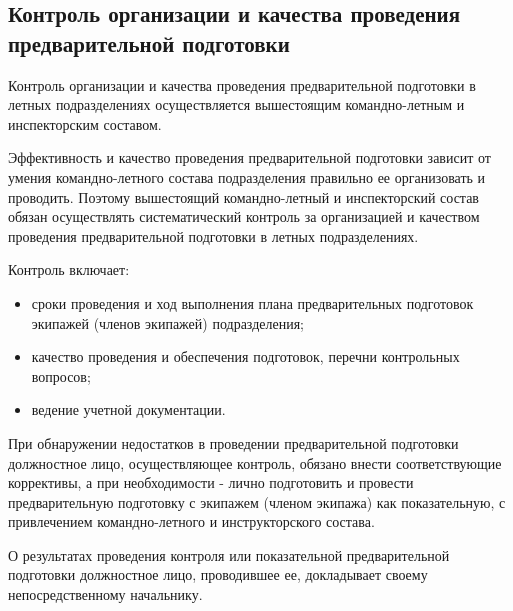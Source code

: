 \subsection{Контроль организации и качества проведения предварительной подготовки}
\setcounter{subsect}{1}

Контроль организации и качества проведения предварительной подготовки в летных подразделениях осуществляется вышестоящим командно-летным и инспекторским составом.

Эффективность и качество проведения предварительной подготовки зависит от умения командно-летного состава подразделения правильно ее организовать и проводить. Поэтому вышестоящий командно-летный и инспекторский состав обязан осуществлять систематический контроль за организацией и качеством проведения предварительной подготовки в летных подразделениях.

Контроль включает:
\begin{itemize}
    \item сроки проведения и ход выполнения плана предварительных подготовок экипажей (членов экипажей) подразделения;
    \item качество проведения и обеспечения подготовок, перечни контрольных вопросов;
    \item ведение учетной документации.
\end{itemize}

При обнаружении недостатков в проведении предварительной подготовки должностное лицо, осуществляющее контроль, обязано внести соответствующие коррективы, а при необходимости - лично подготовить и провести предварительную подготовку с экипажем (членом экипажа) как показательную, с привлечением командно-летного и инструкторского состава.

О результатах проведения контроля или показательной предварительной подготовки должностное лицо, проводившее ее, докладывает своему непосредственному начальнику.